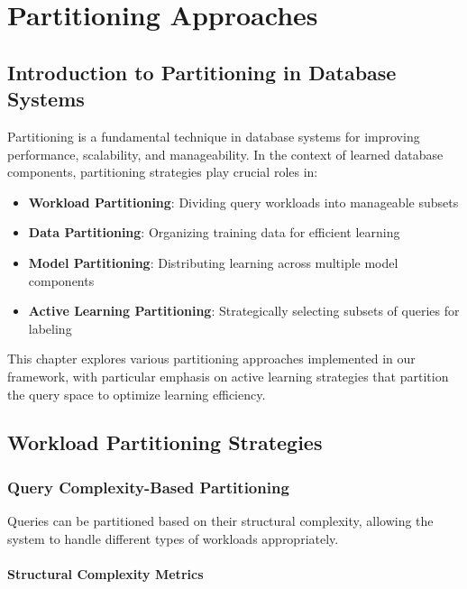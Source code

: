 \chapter{Partitioning Approaches}
\label{chap:partitioning}
\pagestyle{plain}

\section{Introduction to Partitioning in Database Systems}

Partitioning is a fundamental technique in database systems for improving performance, scalability, and manageability. In the context of learned database components, partitioning strategies play crucial roles in:

\begin{itemize}
    \item \textbf{Workload Partitioning}: Dividing query workloads into manageable subsets
    \item \textbf{Data Partitioning}: Organizing training data for efficient learning
    \item \textbf{Model Partitioning}: Distributing learning across multiple model components
    \item \textbf{Active Learning Partitioning}: Strategically selecting subsets of queries for labeling
\end{itemize}

This chapter explores various partitioning approaches implemented in our framework, with particular emphasis on active learning strategies that partition the query space to optimize learning efficiency.

\section{Workload Partitioning Strategies}

\subsection{Query Complexity-Based Partitioning}

Queries can be partitioned based on their structural complexity, allowing the system to handle different types of workloads appropriately.

\subsubsection{Structural Complexity Metrics}

